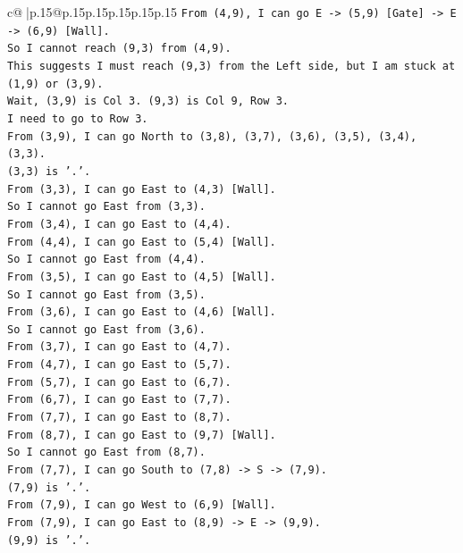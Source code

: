 \documentclass{article}
\begin{document}
{\begin{supertabular}{c@{$\;$}|p{.15\linewidth}@{}p{.15\linewidth}p{.15\linewidth}p{.15\linewidth}p{.15\linewidth}p{.15\linewidth}}
{{{\texttt{From (4,9), I can go E {-}> (5,9) {[}Gate{]} {-}> E {-}> (6,9) {[}Wall{]}.} \\
\texttt{So I cannot reach (9,3) from (4,9).} \\
\texttt{This suggests I must reach (9,3) from the Left side, but I am stuck at (1,9) or (3,9).} \\
\texttt{Wait, (3,9) is Col 3. (9,3) is Col 9, Row 3.} \\
\texttt{I need to go to Row 3.} \\
\texttt{From (3,9), I can go North to (3,8), (3,7), (3,6), (3,5), (3,4), (3,3).} \\
\texttt{(3,3) is '.'.} \\
\texttt{From (3,3), I can go East to (4,3) {[}Wall{]}.} \\
\texttt{So I cannot go East from (3,3).} \\
\texttt{From (3,4), I can go East to (4,4).} \\
\texttt{From (4,4), I can go East to (5,4) {[}Wall{]}.} \\
\texttt{So I cannot go East from (4,4).} \\
\texttt{From (3,5), I can go East to (4,5) {[}Wall{]}.} \\
\texttt{So I cannot go East from (3,5).} \\
\texttt{From (3,6), I can go East to (4,6) {[}Wall{]}.} \\
\texttt{So I cannot go East from (3,6).} \\
\texttt{From (3,7), I can go East to (4,7).} \\
\texttt{From (4,7), I can go East to (5,7).} \\
\texttt{From (5,7), I can go East to (6,7).} \\
\texttt{From (6,7), I can go East to (7,7).} \\
\texttt{From (7,7), I can go East to (8,7).} \\
\texttt{From (8,7), I can go East to (9,7) {[}Wall{]}.} \\
\texttt{So I cannot go East from (8,7).} \\
\texttt{From (7,7), I can go South to (7,8) {-}> S {-}> (7,9).} \\
\texttt{(7,9) is '.'.} \\
\texttt{From (7,9), I can go West to (6,9) {[}Wall{]}.} \\
\texttt{From (7,9), I can go East to (8,9) {-}> E {-}> (9,9).} \\
\texttt{(9,9) is '.'.} \\
}}}
\end{supertabular}}
\end{document}
